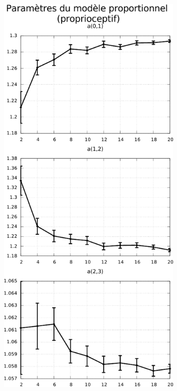 \begin{figure}[h]
    \centerfloat
    \begin{subfigure}{0.4\paperwidth}
        \centering
        \includegraphics[type=pdf,ext=.pdf,read=.pdf,width=0.7\linewidth]{../plot/OdometryCMAES/parametersPropReads}
    \end{subfigure}
    \begin{subfigure}{0.4\paperwidth}
        \centering

\end{subfigure}
\end{figure}

